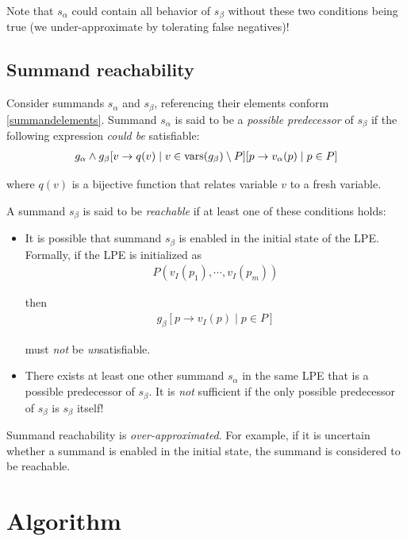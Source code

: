 Note that $s_\alpha$ could contain all behavior of $s_\beta$ without these two conditions being true (we under-approximate by tolerating false negatives)!

\subsection{Summand reachability}

Consider summands $s_\alpha$ and $s_\beta$, referencing their elements conform \ref{summandelements}.
Summand $s_\alpha$ is said to be a \emph{possible predecessor} of $s_\beta$ if the following expression \emph{could be} satisfiable:
\begin{align*}
g_\alpha \land {g_\beta}[v \rightarrow q(v) \;|\; v \in \text{vars}(g_\beta) \setminus P][p \rightarrow v_\alpha(p) \;|\; p \in P]
\end{align*}

where $q(v)$ is a bijective function that relates variable $v$ to a fresh variable.

A summand $s_\beta$ is said to be \emph{reachable} if at least one of these conditions holds:

\begin{itemize}
\item It is possible that summand $s_\beta$ is enabled in the initial state of the LPE.
Formally, if the LPE is initialized as
\begin{align*}
P(v_I(p_1), \cdots{}, v_I(p_m))
\end{align*}

then
\begin{align*}
g_\beta[p \rightarrow v_I(p) \;|\; p \in P]
\end{align*}

must \emph{not} be \emph{un}satisfiable.

\item There exists at least one other summand $s_\alpha$ in the same LPE that is a possible predecessor of $s_\beta$.
It is \emph{not} sufficient if the only possible predecessor of $s_\beta$ is $s_\beta$ itself!
\end{itemize}

Summand reachability is \emph{over-approximated}.
For example, if it is uncertain whether a summand is enabled in the initial state, the summand is considered to be reachable.

\section{Algorithm}

